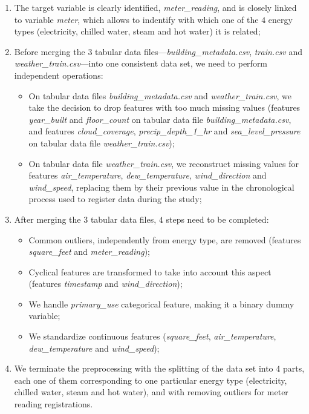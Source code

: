 \documentclass[twocolumn, switch]{article}
\begin{document}
\begin{enumerate}
\item The target variable is clearly identified, \textit{meter\_reading}, and is closely linked to variable \textit{meter}, which allows to indentify with which one of the $4$ energy types (electricity, chilled water, steam and hot water) it is related;
\item Before merging the $3$ tabular data files---\textit{building\_metadata.csv}, \textit{train.csv} and \textit{weather\_train.csv}---into one consistent data set, we need to perform independent operations:
\begin{itemize}
\item On tabular data files \textit{building\_metadata.csv} and \textit{weather\_train.csv}, we take the decision to drop features with too much missing values (features \textit{year\_built} and \textit{floor\_count} on tabular data file \textit{building\_metadata.csv}, and features \textit{cloud\_coverage}, \textit{precip\_depth\_1\_hr} and \textit{sea\_level\_pressure} on tabular data file \textit{weather\_train.csv});
\item On tabular data file \textit{weather\_train.csv}, we reconstruct missing values for features \textit{air\_temperature}, \textit{dew\_temperature}, \textit{wind\_direction} and \textit{wind\_speed}, replacing them by their previous value in the chronological process used to register data during the study;
\end{itemize}
\item After merging the $3$ tabular data files, $4$ steps need to be completed:
\begin{itemize}
\item Common outliers, independently from energy type, are removed (features \textit{square\_feet} and \textit{meter\_reading});
\item Cyclical features are transformed to take into account this aspect (features \textit{timestamp} and \textit{wind\_direction});
\item We handle \textit{primary\_use} categorical feature, making it a binary dummy variable;
\item We standardize continuous features (\textit{square\_feet}, \textit{air\_temperature}, \textit{dew\_temperature} and \textit{wind\_speed});
\end{itemize}
\item We terminate the preprocessing with the splitting of the data set into $4$ parts, each one of them corresponding to one particular energy type (electricity, chilled water, steam and hot water), and with removing outliers for meter reading registrations.
\end{enumerate}
\end{document}
